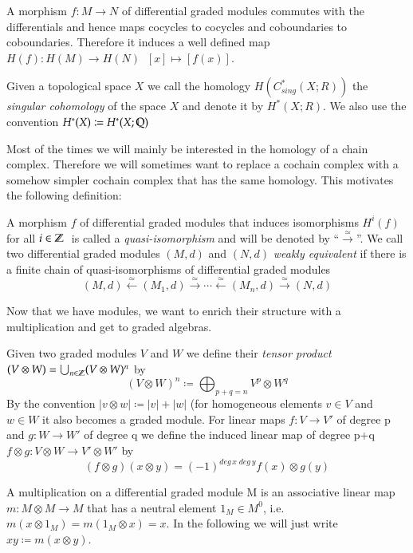 A morphism $f \colon M \to N$ of differential graded modules commutes with the differentials and hence maps cocycles to cocycles
and coboundaries to coboundaries. Therefore it induces a well defined map $H(f) \colon H(M) \to H(N) \; \; [x] \mapsto [f(x)]$. 

\begin{Example}
 Given a topological space $X$ we call the homology $H(C^*_{sing}(X;R))$ the \emph{singular cohomology} of the space $X$
 and denote it by $H^*(X;R)$. We also use the convention $H^*(X) \coloneqq H^*(X; \mathbb{Q})$	
\end{Example}


Most of the times we will mainly be interested in the homology of a chain complex. Therefore we will sometimes want to replace
a cochain complex with a somehow simpler cochain complex that has the same homology. This motivates the following definition:

\begin{Definition}
 A morphism $f$ of differential graded modules that induces isomorphisms $H^i(f)$ for all $i \in \mathbb{Z} \;$ is called a
 \emph{quasi-isomorphism} and will be denoted by ``$\overset{\simeq}{\longrightarrow}$''. \newline
 We call two differential graded modules $(M,d)$ and $(N,d)$ \emph{weakly equivalent} if there is a finite chain of quasi-isomorphisms of differential
 graded modules
 $$ (M,d) \overset{\simeq}{\leftarrow} (M_1,d) \overset{\simeq}{\rightarrow} \cdots 
 \overset{\simeq}{\leftarrow} (M_n,d) \overset{\simeq}{\rightarrow} (N,d)$$
\end{Definition}


Now that we have modules, we want to enrich their structure with a multiplication and get to graded algebras.

\begin{Definition}
 Given two graded modules $V$ and $W$ we define their \emph{tensor product} \newline
 ${(V \otimes W) = \bigcup_{n \in \mathbb{Z}} (V \otimes W)^n }$ by 
 $$ (V \otimes W)^n \coloneqq \bigoplus_{p + q = n} V^p \otimes W^q$$
 By the convention $|v \otimes w| \coloneqq |v| + |w|$ (for homogeneous elements $v \in V$ and $w \in W$
 it also becomes a graded module. \newline
 For linear maps $f \colon V \to V'$ of degree p and $g \colon W \to W'$ of degree q we define the induced linear map
 of degree p+q \;  ${f \otimes g \colon V \otimes W \to V' \otimes W'}$ by
 $$ (f \otimes g) ( x \otimes y) = (-1)^{deg \, x \; deg \,y} f(x) \otimes g(y) $$

 A multiplication on a differential graded module M is an associative linear map \newline
 ${m \colon M \otimes M \to M }$ that has a neutral element $1_M \in M^0$, i.e.\ $m(x \otimes 1_M) = m(1_M \otimes x) = x$.
 In the following we will just write $xy \coloneqq m(x \otimes y)$.
 \end{Definition}

